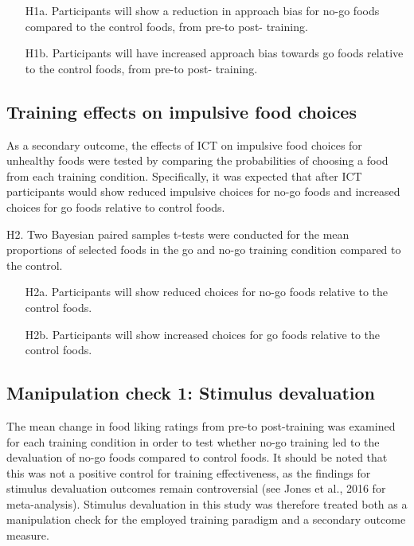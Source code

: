 \documentclass[man,floatsintext]{apa6}
\begin{document}
\begin{itemize}
\item[H1a.] Participants will show a reduction in approach bias for no-go foods compared to the control foods, from pre-to post- training.
\item[H1b.] Participants will have increased approach bias towards go foods relative to the control foods, from pre-to post- training.
\end{itemize}

\hypertarget{training-effects-on-impulsive-food-choices}{%
\subsection{Training effects on impulsive food choices}\label{training-effects-on-impulsive-food-choices}}

As a secondary outcome, the effects of ICT on impulsive food choices for unhealthy foods were tested by comparing the probabilities of choosing a food from each training condition. Specifically, it was expected that after ICT participants would show reduced impulsive choices for no-go foods and increased choices for go foods relative to control foods.

\noindent H2. Two Bayesian paired samples t-tests were conducted for the mean proportions of selected foods in the go and no-go training condition compared to the control.

\begin{itemize}
\item[H2a.] Participants will show reduced choices for no-go foods relative to the control foods.
\item[H2b.] Participants will show increased choices for go foods relative to the control foods.
\end{itemize}

\hypertarget{manipulation-check-1-stimulus-devaluation}{%
\subsection{Manipulation check 1: Stimulus devaluation}\label{manipulation-check-1-stimulus-devaluation}}

The mean change in food liking ratings from pre-to post-training was examined for each training condition in order to test whether no-go training led to the devaluation of no-go foods compared to control foods. It should be noted that this was not a positive control for training effectiveness, as the findings for stimulus devaluation outcomes remain controversial (see Jones et al., 2016 for meta-analysis). Stimulus devaluation in this study was therefore treated both as a manipulation check for the employed training paradigm and a secondary outcome measure.
\end{document}
